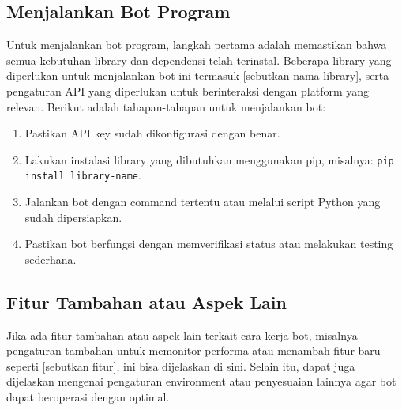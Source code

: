 \subsection{Menjalankan Bot Program}
Untuk menjalankan bot program, langkah pertama adalah memastikan bahwa semua kebutuhan library dan dependensi telah terinstal. Beberapa library yang diperlukan untuk menjalankan bot ini termasuk [sebutkan nama library], serta pengaturan API yang diperlukan untuk berinteraksi dengan platform yang relevan. Berikut adalah tahapan-tahapan untuk menjalankan bot:
    \begin{enumerate}
        \item Pastikan API key sudah dikonfigurasi dengan benar.
        \item Lakukan instalasi library yang dibutuhkan menggunakan pip, misalnya: \texttt{pip install library-name}.
        \item Jalankan bot dengan command tertentu atau melalui script Python yang sudah dipersiapkan.
        \item Pastikan bot berfungsi dengan memverifikasi status atau melakukan testing sederhana.
    \end{enumerate}

\bigskip

\subsection{Fitur Tambahan atau Aspek Lain}
 Jika ada fitur tambahan atau aspek lain terkait cara kerja bot, misalnya pengaturan tambahan untuk memonitor performa atau menambah fitur baru seperti [sebutkan fitur], ini bisa dijelaskan di sini. Selain itu, dapat juga dijelaskan mengenai pengaturan environment atau penyesuaian lainnya agar bot dapat beroperasi dengan optimal.
